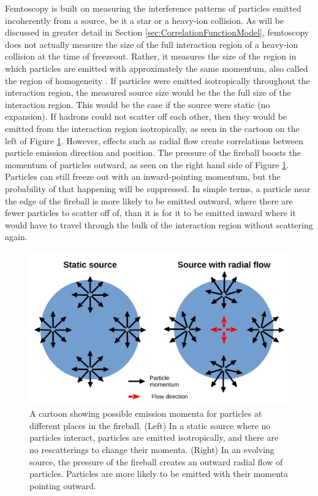 Femtoscopy is built on measuring the interference patterns of particles emitted incoherently from a source, be it a star or a heavy-ion collision.
As will be discussed in greater detail in Section \ref{sec:CorrelationFunctionModel}, femtoscopy does not actually measure the size of the full interaction region of a heavy-ion collision at the time of freezeout.
Rather, it measures the size of the region in which particles are emitted with approximately the same momentum, also called the region of homogeneity \cite{Akkelin:1995gh}.
If particles were emitted isotropically throughout the interaction region, the measured source size would be the the full size of the interaction region.
This would be the case if the source were static (no expansion).
If hadrons could not scatter off each other, then they would be emitted from the interaction region isotropically, as seen in the cartoon on the left of Figure \ref{fig:FlowAndMomentum}.
However, effects such as radial flow create correlations between particle emission direction and position. 
The pressure of the fireball boosts the momentum of particles outward, as seen on the right hand side of Figure \ref{fig:FlowAndMomentum}.
Particles can still freeze out with an inward-pointing momentum, but the probability of that happening will be suppressed.
In simple terms, a particle near the edge of the fireball is more likely to be emitted outward, where there are fewer particles to scatter off of, than it is for it to be emitted inward where it would have to travel through the bulk of the interaction region without scattering again. 

\begin{figure}[hbt]
\includegraphics[width=36pc]{Figures/HomemadeFigures/FlowAndMomentum.pdf}
\caption[Effect of radial flow on momentum]{A cartoon showing possible emission momenta for particles at different places in the fireball.
(Left) In a static source where no particles interact, particles are emitted isotropically, and there are no rescatterings to change their momenta.
(Right) In an evolving source, the pressure of the fireball creates an outward radial flow of particles.
Particles are more likely to be emitted with their momenta pointing outward.}
\label{fig:FlowAndMomentum}
\end{figure}

